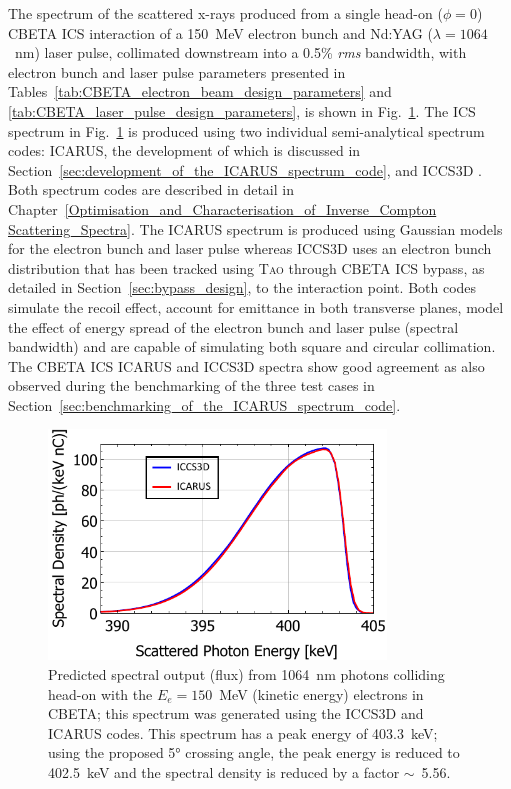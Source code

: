 \documentclass[../main.tex]{subfiles}
\begin{document}
The spectrum of the scattered x-rays produced from a single head-on ($\phi = 0$) CBETA ICS interaction of a 150~\si{\mega\electronvolt} electron bunch and Nd:YAG ($\lambda = 1064$~\si{\nano\meter}) laser pulse, collimated downstream into a 0.5\% \textit{rms} bandwidth, with electron bunch and laser pulse parameters presented in Tables~\ref{tab:CBETA_electron_beam_design_parameters} and \ref{tab:CBETA_laser_pulse_design_parameters}, is shown in Fig.~\ref{fig:CBETA_spectrum_benchmarking}. The ICS spectrum in Fig.~\ref{fig:CBETA_spectrum_benchmarking} is produced using two individual semi-analytical spectrum codes: \textsc{ICARUS}, the development of which is discussed in Section~\ref{sec:development_of_the_ICARUS_spectrum_code}, and \textsc{ICCS3D} \cite{krafft2016laser,ranjan2018simulation}. Both spectrum codes are described in detail in Chapter~\ref{Optimisation_and_Characterisation_of_Inverse_Compton Scattering_Spectra}. The \textsc{ICARUS} spectrum is produced using Gaussian models for the electron bunch and laser pulse whereas \textsc{ICCS3D} uses an electron bunch distribution that has been tracked using \textsc{Tao} \cite{TaoManual} through CBETA ICS bypass, as detailed in Section~\ref{sec:bypass_design}, to the interaction point. Both codes simulate the recoil effect, account for emittance in both transverse planes, model the effect of energy spread of the electron bunch and laser pulse (spectral bandwidth) and are capable of simulating both square and circular collimation. The CBETA ICS \textsc{ICARUS} and \textsc{ICCS3D} spectra show good agreement as also observed during the benchmarking of the three test cases in Section~\ref{sec:benchmarking_of_the_ICARUS_spectrum_code}.
\begin{figure}[!h]
\centering
\includegraphics[width=0.8\textwidth]{Figures/CBETA_Inverse_Compton_Source_Design/CBETA150_spectrum_FINAL.pdf}
\caption{Predicted spectral output (flux) from 1064~\si{\nano\meter} photons colliding head-on with the $E_e =150$~\si{\mega\electronvolt} (kinetic energy) electrons in CBETA; this spectrum was generated using the \textsc{ICCS3D} and \textsc{ICARUS} codes. This spectrum has a peak energy of 403.3~\si{\kilo\electronvolt}; using the proposed 5\si{\degree} crossing angle, the peak energy is reduced to 402.5~\si{\kilo\electronvolt} and the spectral density is reduced by a factor $\sim$~5.56.}
\label{fig:CBETA_spectrum_benchmarking}
\end{figure}
\end{document}
